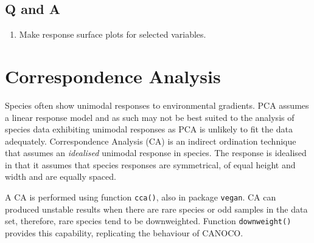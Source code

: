 \documentclass[a4paper,10pt]{article}
\newcommand{\cca}{\texttt{cca()}\xspace}
\begin{document}
\subsection*{Q and A}
\begin{enumerate}
\item Make response surface plots for selected variables.
\end{enumerate}

\section{Correspondence Analysis}
Species often show unimodal responses to environmental gradients. PCA assumes a linear response model and as such may not be best suited to the analysis of species data exhibiting unimodal responses as PCA is unlikely to fit the data adequately. Correspondence Analysis (CA) is an indirect ordination technique that assumes an \emph{idealised} unimodal response in species. The response is idealised in that it assumes that species responses are symmetrical, of equal height and width and are equally spaced.

A CA is performed using function \cca, also in package \texttt{vegan}. CA can produced unstable results when there are rare species or odd samples in the data set, therefore, rare species tend to be downweighted. Function \texttt{downweight()} provides this capability, replicating the behaviour of CANOCO.
\end{document}
